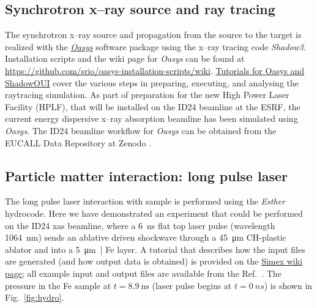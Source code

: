 \subsection{Synchrotron x--ray source and ray tracing}
The synchrotron x--ray source and propagation from the source to the target is
realized with the
\href{http://ftp.esrf.eu/pub/scisoft/Oasys/readme.html}{\textit{Oasys}}
software package using the x--ray tracing
code \textit{Shadow3}. Installation scripts and the wiki page for \textit{Oasys} can be
found at
\href{https://github.com/srio/oasys-installation-scripts/wiki}{https://github.com/srio/oasys-installation-scripts/wiki}.
\href{https://github.com/srio/ShadowOui-Tutorial}{Tutorials for
Oasys and ShadowOUI} cover the various steps in preparing, executing, and
analysing the raytracing simulation. As part of preparation for the new High Power
Laser Facility (HPLF), that will be installed on the ID24 beamline at the ESRF,
the current energy dispersive x--ray absorption beamline has been simulated using
\textit{Oasys}.
The ID24 beamline workflow for \textit{Oasys} can be obtained from the EUCALL Data
Repository at Zenodo \cite{Briggs2017.zenodo.886451}.

\subsection{Particle matter interaction: long pulse laser}
The long pulse laser interaction with sample is performed using the \textit{Esther} hydrocode.
Here we have demonstrated an experiment that could be performed on the
ID24 \gls{xas} beamline, where a \SI{6}{\nano\second} flat top laser pulse (wavelength
\SI{1064}{\nano\metre}) sends an ablative
driven shockwave through a \SI{45}{\micro\metre} CH-plastic ablator and into a
\SI{5}{\micro\metre|} Fe layer. A
tutorial that describes how the input files are generated (and how output data is
obtained) is provided on the
\href{https://www.github.com/eucall-software/simex_platform/wiki/Esther-Hydrocode-Tutorial}{Simex
wiki page}; all example input
and output files are available from the Ref.~\cite{Briggs2017.zenodo.883106}.
The pressure in the Fe sample at $t = \SI{8.9}{\nano\second}$
(laser pulse begins at $t = \SI{0}{ns}$) is shown in Fig.~\ref{fig:hydro}.

